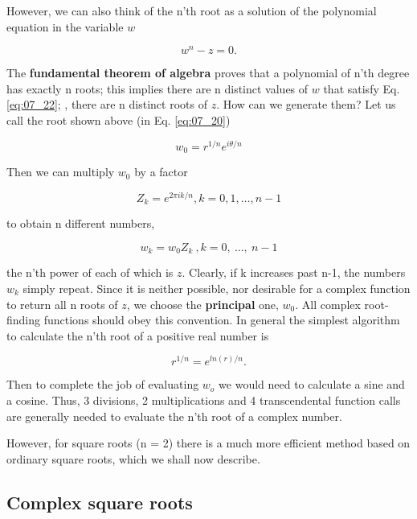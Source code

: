 However, we can also think of the n'th root as a solution of the polynomial equation in the variable $w$

\begin{equation}
  w^n - z = 0.
  \label{eq:07_22}
\end{equation}

The \textbf{fundamental theorem of algebra} proves that a polynomial of n'th degree has exactly n roots; this implies there are n distinct values of $w$ that satisfy Eq. \ref{eq:07_22}; \ie, there are n distinct roots of $z$. How can we generate them? Let us call the root shown above (in Eq. \ref{eq:07_20})

\begin{equation*}
  w_0 = r^{1/n} e^{i\theta/n}
\end{equation*}

Then we can multiply $w_0$ by a factor

\begin{equation}
  Z_k = e^{2\pi ik/n}, k = 0, 1, \ldots, n-1
\end{equation}

to obtain n different numbers,

\begin{equation*}
  w_k = w_0Z_k\ , k=0,\ \ldots,\ n-1
\end{equation*}

the n'th power of each of which is $z$. Clearly, if k increases past n-1, the numbers $w_k$ simply repeat. Since it is neither possible, nor desirable for a complex function to return all n roots of $z$, we choose the \textbf{principal} one, $w_0$. All complex root-finding functions should obey this convention. In general the simplest algorithm to calculate the n’th root of a positive real number is

\begin{equation}
  r^{1/n} = e^{ln(r)/n}.
\end{equation}

Then to complete the job of evaluating $w_o$ we would need to calculate a sine and a cosine. Thus, 3 divisions, 2 multiplications and 4 transcendental function calls are generally needed to evaluate the n'th root of a complex number.

However, for square roots (n = 2) there is a much more efficient method based on ordinary square roots, which we shall now describe.

\subsection{Complex square roots}

